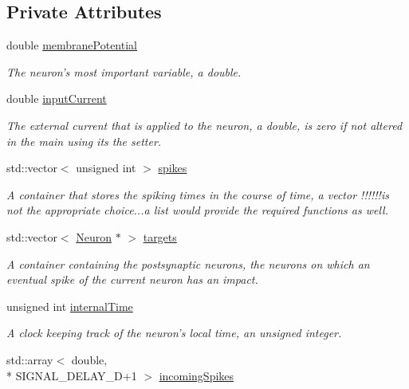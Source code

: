 \subsection*{Private Attributes}
\begin{DoxyCompactItemize}
\item 
\hypertarget{classNeuron_a311f3321f19462c0aef8cbd68c60df67}{double \hyperlink{classNeuron_a311f3321f19462c0aef8cbd68c60df67}{membrane\-Potential}}\label{classNeuron_a311f3321f19462c0aef8cbd68c60df67}

\begin{DoxyCompactList}\small\item\em The neuron's most important variable, a double. \end{DoxyCompactList}\item 
\hypertarget{classNeuron_a50505e8dcb655170bfc9562465fd907f}{double \hyperlink{classNeuron_a50505e8dcb655170bfc9562465fd907f}{input\-Current}}\label{classNeuron_a50505e8dcb655170bfc9562465fd907f}

\begin{DoxyCompactList}\small\item\em The external current that is applied to the neuron, a double, is zero if not altered in the main using its the setter. \end{DoxyCompactList}\item 
\hypertarget{classNeuron_ab358994e1a6e4d3a1399906471657b4b}{std\-::vector$<$ unsigned int $>$ \hyperlink{classNeuron_ab358994e1a6e4d3a1399906471657b4b}{spikes}}\label{classNeuron_ab358994e1a6e4d3a1399906471657b4b}

\begin{DoxyCompactList}\small\item\em A container that stores the spiking times in the course of time, a vector !!!!!!is not the appropriate choice...a list would provide the required functions as well. \end{DoxyCompactList}\item 
\hypertarget{classNeuron_a5c97843cd38dd8c5ff2d861d25e18473}{std\-::vector$<$ \hyperlink{classNeuron}{Neuron} $\ast$ $>$ \hyperlink{classNeuron_a5c97843cd38dd8c5ff2d861d25e18473}{targets}}\label{classNeuron_a5c97843cd38dd8c5ff2d861d25e18473}

\begin{DoxyCompactList}\small\item\em A container containing the postsynaptic neurons, the neurons on which an eventual spike of the current neuron has an impact. \end{DoxyCompactList}\item 
unsigned int \hyperlink{classNeuron_adb1a016b5d339ba3ba95367bb66f391a}{internal\-Time}
\begin{DoxyCompactList}\small\item\em A clock keeping track of the neuron's local time, an unsigned integer. \end{DoxyCompactList}\item 
std\-::array$<$ double, \\*
S\-I\-G\-N\-A\-L\-\_\-\-D\-E\-L\-A\-Y\-\_\-\-D+1 $>$ \hyperlink{classNeuron_a15160c28823ad0e63f171af31fd6b1ea}{incoming\-Spikes}
\end{DoxyCompactItemize}
